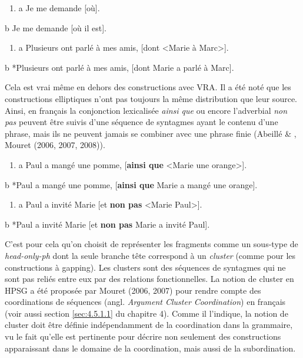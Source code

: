 \begin{enumerate}
\item a  Je me demande [où]. 


\end{enumerate}
  b  Je me demande [où il est].


\begin{enumerate}
\item \label{bkm:Ref298867546}a  Plusieurs ont parlé à mes amis, [dont {\textless}Marie à Marc{\textgreater}]. 


\end{enumerate}
  b  *Plusieurs ont parlé à mes amis, [dont Marie a parlé à Marc].

Cela est vrai même en dehors des constructions avec VRA. Il a été noté que les constructions elliptiques n'ont pas toujours la même distribution que leur source. Ainsi, en français la conjonction lexicalisée \textit{ainsi que} ou encore l'adverbial \textit{non pas} peuvent être suivis d'une séquence de syntagmes ayant le contenu d'une phrase, mais ils ne peuvent jamais se combiner avec une phrase finie (Abeillé \& \citet{Godard1996}, Mouret (2006, 2007, 2008)).


\begin{enumerate}
\item \label{bkm:Ref298951685}a  Paul a mangé une pomme, [\textbf{ainsi que} {\textless}Marie une orange{\textgreater}]. 


\end{enumerate}
  b  *Paul a mangé une pomme, [\textbf{ainsi que} Marie a mangé une orange].


\begin{enumerate}
\item \label{bkm:Ref298951687}a  Paul a invité Marie [et \textbf{non pas} {\textless}Marie Paul{\textgreater}]. 


\end{enumerate}
  b  *Paul a invité Marie [et \textbf{non pas} Marie a invité Paul].

C'est pour cela qu'on choisit de représenter les fragments comme un sous-type de \textit{head-only-ph} dont la seule branche tête correspond à un \textit{cluster} (comme pour les constructions à gapping). Les clusters sont des séquences de syntagmes qui ne sont pas reliés entre eux par des relations fonctionnelles. La notion de cluster en HPSG a été proposée par Mouret (2006, 2007) pour rendre compte des coordinations de séquences (angl. \textit{Argument Cluster Coordination}) en français (voir aussi section \ref{sec:4.5.1.1} du chapitre 4). Comme il l'indique, la notion de cluster doit être définie indépendamment de la coordination dans la grammaire, vu le fait qu'elle est pertinente pour décrire non seulement des constructions apparaissant dans le domaine de la coordination, mais aussi de la subordination.

